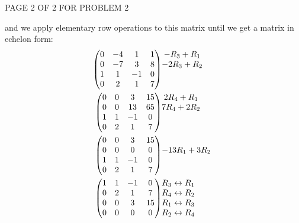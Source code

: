 \documentclass[12pt]{article}
\newenvironment{problem}[2][Problem]
{
	\begin{trivlist} 
		\item[\hskip \labelsep {\bfseries #1 #2:}]
	}
{
	\end{trivlist}
	}
\begin{document}
\begin{problem}{6}
\vfill
\centerline{PAGE 2 OF 2 FOR PROBLEM 2}
%
%
%
\newpage
and we apply elementary row operations to this matrix until we get a matrix in echelon form:
\begin{align*}
\begin{pmatrix}0&-4&1&1\\0&-7&3&8\\1&1&-1&0\\0&2&1&7\end{pmatrix}
&\begin{matrix}-R_3+R_1\hphantom{1}\\-2R_3+R_2\hphantom{1}\\\hphantom{1}\\\hphantom{1}\end{matrix}\\
\begin{pmatrix}0&0&3&15\\0&0&13&65\\1&1&-1&0\\0&2&1&7\end{pmatrix}
&\begin{matrix}2R_4+R_1\hphantom{1}\\7R_4+2R_2\hphantom{1}\\\hphantom{1}\\\hphantom{1}\end{matrix}\\
\begin{pmatrix}0&0&3&15\\0&0&0&0\\1&1&-1&0\\0&2&1&7\end{pmatrix}
&\begin{matrix}\hphantom{1}\\-13R_1+3R_2\hphantom{1}\\\hphantom{1}\\\hphantom{1}\end{matrix}\\
\begin{pmatrix}1&1&-1&0\\0&2&1&7\\0&0&3&15\\0&0&0&0\end{pmatrix}
&\begin{matrix}R_3 \leftrightarrow R_1\hphantom{1}\\R_4 \leftrightarrow R_2\hphantom{1}\\R_1 \leftrightarrow R_3\hphantom{1}\\R_2 \leftrightarrow R_4\hphantom{1}\end{matrix}\\

\end{align*}
\end{problem}
\end{document}
